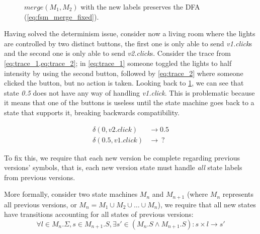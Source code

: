 \documentclass[a4paper]{article}
\begin{document}
\begin{figure}[ht]
    \centering
    \caption{$merge(M_1, M_2)$  with the new labels preserves the DFA (\cref{eq:fsm_merge_fixed}).}
    \label{fig:bulb_fsm_merge_dfa}
\end{figure}

Having solved the determinism issue, consider now a living room where the lights are controlled by
two distinct buttons, the first one is only able to send \emph{v1.click}s and the
second one is only able to send \emph{v2.click}s.
Consider the trace from \cref{eq:trace_1,eq:trace_2};
in \cref{eq:trace_1} someone toggled the lights to half intensity by using the second button,
followed by \cref{eq:trace_2} where someone clicked the button, but no action is taken.
Looking back to \cref{fig:bulb_fsm_merge_dfa}, we can see that state \emph{0.5} does not
have any way of handling \emph{v1.click}.
This is problematic because it means that one of the buttons is useless until the state machine
goes back to a state that supports it, breaking backwards compatibility.

\begin{subequations}
    \begin{align}
        \delta(0, v2.click)   & \rightarrow 0.5 \label{eq:trace_1} \\
        \delta(0.5, v1.click) & \rightarrow~? \label{eq:trace_2}
    \end{align}
\end{subequations}

To fix this, we require that each new version be complete regarding previous versions'
symbols, that is, each new version state must handle \emph{all} state labels from previous versions.

More formally, consider two state machines $M_n$ and $M_{n+1}$ (where $M_n$ represents all previous versions, or $M_n = M_1 \cup M_2 \cup \dots \cup M_n$),
we require that all new states have transitions accounting for all states of previous versions:
\begin{equation}
    \forall l \in M_n.\Sigma, s \in M_{n+1}.S, \exists s' \in (M_n.S \land M_{n+1}.S) : s \times l \rightarrow s'
\end{equation}
\end{document}
